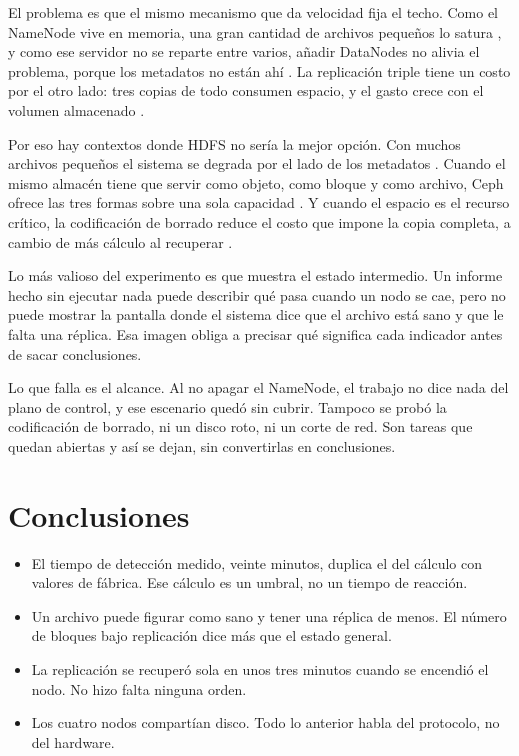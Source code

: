 \documentclass[12pt,a4paper]{article}
\begin{document}
El problema es que el mismo mecanismo que da velocidad fija el techo. Como el NameNode vive en memoria, una gran cantidad de archivos pequeños lo satura \cite[p.~1]{tchaye2019hpf}, y como ese servidor no se reparte entre varios, añadir DataNodes no alivia el problema, porque los metadatos no están ahí \cite[p.~2830]{dhulavvagol2023performance}. La replicación triple tiene un costo por el otro lado: tres copias de todo consumen espacio, y el gasto crece con el volumen almacenado \cite[p.~18551]{ahmed2023replication}.

Por eso hay contextos donde HDFS no sería la mejor opción. Con muchos archivos pequeños el sistema se degrada por el lado de los metadatos \cite[p.~1]{tchaye2019hpf}. Cuando el mismo almacén tiene que servir como objeto, como bloque y como archivo, Ceph ofrece las tres formas sobre una sola capacidad \cite[p.~3]{chum2021supporting}. Y cuando el espacio es el recurso crítico, la codificación de borrado reduce el costo que impone la copia completa, a cambio de más cálculo al recuperar \cite[p.~3]{kim2021erasure}.

Lo más valioso del experimento es que muestra el estado intermedio. Un informe hecho sin ejecutar nada puede describir qué pasa cuando un nodo se cae, pero no puede mostrar la pantalla donde el sistema dice que el archivo está sano y que le falta una réplica. Esa imagen obliga a precisar qué significa cada indicador antes de sacar conclusiones.

Lo que falla es el alcance. Al no apagar el NameNode, el trabajo no dice nada del plano de control, y ese escenario quedó sin cubrir. Tampoco se probó la codificación de borrado, ni un disco roto, ni un corte de red. Son tareas que quedan abiertas y así se dejan, sin convertirlas en conclusiones.

\section{Conclusiones}

\begin{itemize}
\setlength{\itemsep}{0.3em}
\item El tiempo de detección medido, veinte minutos, duplica el del cálculo con valores de fábrica. Ese cálculo es un umbral, no un tiempo de reacción.
\item Un archivo puede figurar como sano y tener una réplica de menos. El número de bloques bajo replicación dice más que el estado general.
\item La replicación se recuperó sola en unos tres minutos cuando se encendió el nodo. No hizo falta ninguna orden.
\item Los cuatro nodos compartían disco. Todo lo anterior habla del protocolo, no del hardware.
\end{itemize}
\end{document}
